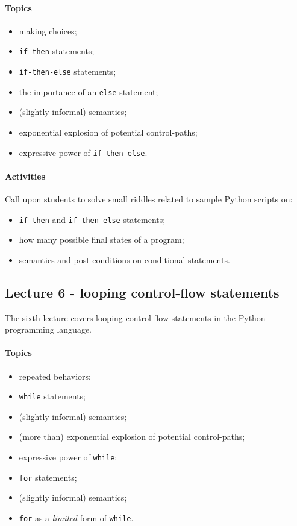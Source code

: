 				\paragraph*{Topics}
					\begin{itemize}
						\item making choices;
						\item \texttt{if-then} statements;
						\item \texttt{if-then-else} statements;
						\item the importance of an \texttt{else} statement;
						\item (slightly informal) semantics;
						\item exponential explosion of potential control-paths;
						\item expressive power of \texttt{if-then-else}.
					\end{itemize}

				\paragraph*{Activities}
					Call upon students to solve small riddles related to sample Python scripts on:

					\begin{itemize}
						\item \texttt{if-then} and \texttt{if-then-else} statements;
						\item how many possible final states of a program;
						\item semantics and post-conditions on conditional statements.
					\end{itemize}


			\subsection{Lecture 6 - looping control-flow statements}
				The sixth lecture covers looping control-flow statements in the Python programming language.

				\paragraph*{Topics}
					\begin{itemize}
						\item repeated behaviors;
						\item \texttt{while} statements;
						\item (slightly informal) semantics;
						\item (more than) exponential explosion of potential control-paths;
						\item expressive power of \texttt{while};
						\item \texttt{for} statements;
						\item (slightly informal) semantics;
						\item \texttt{for} as a \textit{limited} form of \texttt{while}.
					\end{itemize}


